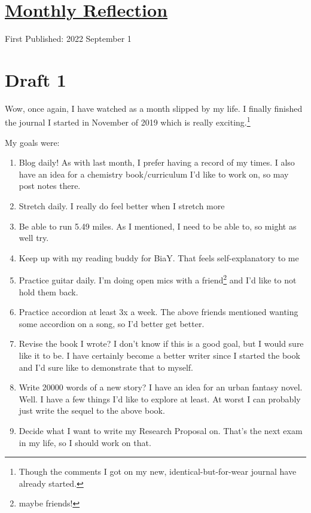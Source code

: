\documentclass[12pt]{article}[titlepage]
\renewcommand{\,}{\textsuperscript{,}}
\begin{document}
\doublespacing
\section{\href{reflection-august-2022.html}{Monthly Reflection}}
First Published: 2022 September 1

\section{Draft 1}
Wow, once again, I have watched as a month slipped by my life.
I finally finished the journal I started in November of 2019 which is really exciting.\footnote{Though the comments I got on my new, identical-but-for-wear journal have already started.}

My goals were:
\begin{enumerate}
\item Blog daily! As with last month, I prefer having a record of my times. I also have an idea for a chemistry book/curriculum I'd like to work on, so may post notes there.
\item Stretch daily. I really do feel better when I stretch more
\item Be able to run 5.49 miles. As I mentioned, I need to be able to, so might as well try.
\item Keep up with my reading buddy for BiaY. That feels self-explanatory to me
\item Practice guitar daily. I'm doing open mics with a friend\footnote{maybe friends!} and I'd like to not hold them back.
\item Practice accordion at least 3x a week. The above friends mentioned wanting some accordion on a song, so I'd better get better.
\item Revise the book I wrote? I don't know if this is a good goal, but I would sure like it to be. I have certainly become a better writer since I started the book and I'd sure like to demonstrate that to myself.
\item Write 20000 words of a new story? I have an idea for an urban fantasy novel. Well. I have a few things I'd like to explore at least. At worst I can probably just write the sequel to the above book.
\item Decide what I want to write my Research Proposal on. That's the next exam in my life, so I should work on that.
\end{enumerate}
\end{document}
